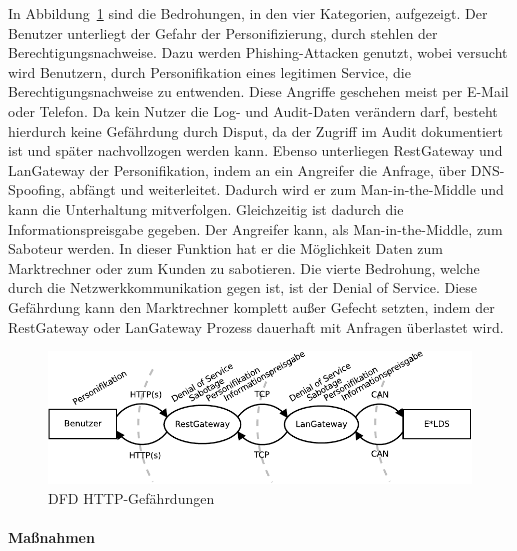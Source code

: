 \documentclass[11pt,a4paper]{report}
\begin{document}
In Abbildung~\ref{fig:dfd_http_threat} sind die Bedrohungen, in den vier Kategorien, aufgezeigt. Der Benutzer unterliegt der Gefahr der Personifizierung, durch stehlen der Berechtigungsnachweise. Dazu werden Phishing-Attacken genutzt, wobei versucht wird Benutzern, durch Personifikation eines legitimen Service, die Berechtigungsnachweise zu entwenden. Diese Angriffe geschehen meist per E-Mail oder Telefon. Da kein Nutzer die Log- und Audit-Daten verändern darf, besteht hierdurch keine Gefährdung durch Disput, da der Zugriff im Audit dokumentiert ist und später nachvollzogen werden kann. Ebenso unterliegen RestGateway und LanGateway der Personifikation, indem an ein Angreifer die Anfrage, über DNS-Spoofing, abfängt und weiterleitet. Dadurch wird er zum Man-in-the-Middle und kann die Unterhaltung mitverfolgen. Gleichzeitig ist dadurch die Informationspreisgabe gegeben. Der Angreifer kann, als Man-in-the-Middle, zum Saboteur werden. In dieser Funktion hat er die Möglichkeit Daten zum Marktrechner oder zum Kunden zu sabotieren. Die vierte Bedrohung, welche durch die Netzwerkkommunikation gegen ist, ist der Denial of Service. Diese Gefährdung kann den Marktrechner komplett außer Gefecht setzten, indem der RestGateway oder LanGateway Prozess dauerhaft mit Anfragen überlastet wird.

\begin{figure}[htbp]
\centering
\includegraphics[scale=1]{images/dfd_http_threat.pdf}
\caption{DFD HTTP-Gefährdungen}
\label{fig:dfd_http_threat}
\end{figure}

\paragraph{Maßnahmen}
\end{document}
